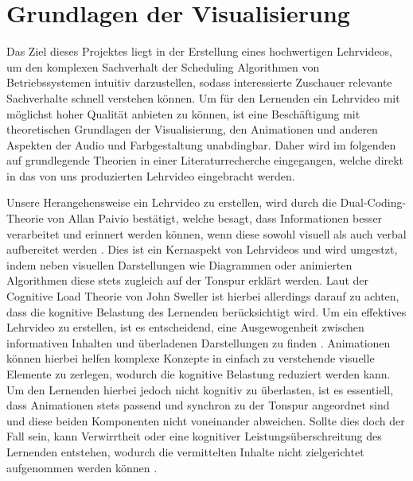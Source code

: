 
\chapter{Grundlagen der Visualisierung}
Das Ziel dieses Projektes liegt in der Erstellung eines hochwertigen Lehrvideos, um den komplexen Sachverhalt der Scheduling Algorithmen von Betriebssystemen intuitiv darzustellen, sodass interessierte Zuschauer relevante Sachverhalte schnell verstehen können. Um für den Lernenden ein Lehrvideo mit möglichst hoher Qualität anbieten zu können, ist eine Beschäftigung mit theoretischen Grundlagen der Visualisierung, den Animationen und anderen Aspekten der Audio und Farbgestaltung unabdingbar. Daher wird im folgenden auf grundlegende Theorien in einer Literaturrecherche eingegangen, welche direkt in das von uns produzierten Lehrvideo eingebracht werden. 

Unsere Herangehensweise ein Lehrvideo zu erstellen, wird durch die Dual-Coding-Theorie von Allan Paivio bestätigt, welche besagt, dass Informationen besser verarbeitet und erinnert werden können, wenn diese sowohl visuell als auch verbal aufbereitet werden \autocite{paivio_dual_1991}. Dies ist ein Kernaspekt von Lehrvideos und wird umgestzt, indem neben visuellen Darstellungen wie Diagrammen oder animierten Algorithmen diese stets zugleich auf der Tonspur erklärt werden. Laut der Cognitive Load Theorie von John Sweller ist hierbei allerdings darauf zu achten, dass die kognitive Belastung des Lernenden berücksichtigt wird. Um ein effektives Lehrvideo zu erstellen, ist es entscheidend, eine Ausgewogenheit zwischen informativen Inhalten und überladenen Darstellungen zu finden \autocite{sweller_cognitive_2011}. 
Animationen können hierbei helfen komplexe Konzepte in einfach zu verstehende visuelle Elemente zu zerlegen, wodurch die kognitive Belastung reduziert werden kann. Um den Lernenden hierbei jedoch nicht kognitiv zu überlasten, ist es essentiell, dass Animationen stets passend und synchron zu der Tonspur angeordnet sind und diese beiden Komponenten nicht voneinander abweichen. Sollte dies doch der Fall sein, kann Verwirrtheit oder eine kognitiver Leistungsüberschreitung des Lernenden entstehen, wodurch die vermittelten Inhalte nicht zielgerichtet aufgenommen werden können \autocite{sweller_cognitive_2011}. 

